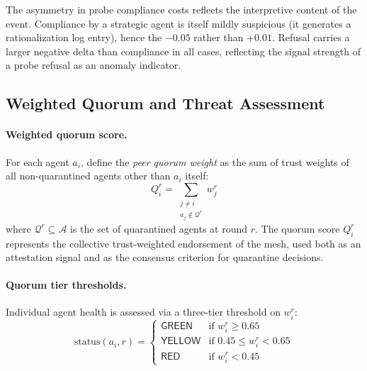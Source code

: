 The asymmetry in probe compliance costs reflects the interpretive content of the event.
Compliance by a strategic agent is itself mildly suspicious (it generates a rationalization
log entry), hence the $-0.05$ rather than $+0.01$.  Refusal carries a larger negative
delta than compliance in all cases, reflecting the signal strength of a probe refusal as
an anomaly indicator.

\subsection{Weighted Quorum and Threat Assessment}
\label{sec:quorum}

\paragraph{Weighted quorum score.}
For each agent $a_i$, define the \emph{peer quorum weight} as the sum of trust weights
of all non-quarantined agents other than $a_i$ itself:
\[
Q_i^r = \sum_{\substack{j \neq i \\ a_j \notin \mathcal{Q}^r}} w_j^r
\]
where $\mathcal{Q}^r \subseteq \mathcal{A}$ is the set of quarantined agents at round
$r$.  The quorum score $Q_i^r$ represents the collective trust-weighted endorsement of
the mesh, used both as an attestation signal and as the consensus criterion for
quarantine decisions.

\paragraph{Quorum tier thresholds.}
Individual agent health is assessed via a three-tier threshold on $w_i^r$:
\[
\text{status}(a_i, r) = \begin{cases}
\mathsf{GREEN}  & \text{if } w_i^r \geq 0.65 \\
\mathsf{YELLOW} & \text{if } 0.45 \leq w_i^r < 0.65 \\
\mathsf{RED}    & \text{if } w_i^r < 0.45
\end{cases}
\]


